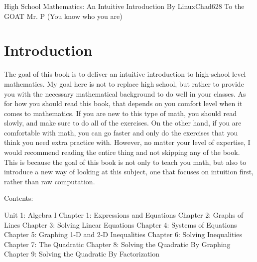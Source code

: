 \documentclass{book} %
\begin{document}
\begin{center}
\Large{High School Mathematics: An Intuitive Introduction}
\newline
\newline
\normalsize{By LinuxChad628}
\newpage
To the GOAT Mr. P (You know who you are)
\newpage
\end{center}
\chapter*{Introduction}
The goal of this book is to deliver an intuitive introduction to high-school level mathematics.
My goal here is not to replace high school, but rather to provide you with the necessary mathematical background to do well in your classes.
As for how you should read this book, that depends on you comfort level when it comes to mathematics. If you are new to this type of math, you should read slowly,
and make sure to do all of the exercises. On the other hand, if you are comfortable with math, you can go faster and only do the exercises that you think you need extra practice with.
However, no matter your level of expertise, I would recommend reading the entire thing and not skipping any of the book.
This is because the goal of this book is not only to teach you math, but also to introduce a new way of looking at this subject, one that focuses on intuition first, rather than raw computation.
\newpage
\begin{center}Contents:\end{center}
\small{Unit 1: Algebra I}
\newline
\indent \footnotesize{Chapter 1: Expressions and Equations}
\newline
\indent \footnotesize{Chapter 2: Graphs of Lines}
\newline
\indent \footnotesize{Chapter 3: Solving Linear Equations}
\newline
\indent \footnotesize{Chapter 4: Systems of Equations}
\newline
\indent \footnotesize{Chapter 5: Graphing 1-D and 2-D Inequalities}
\newline
\indent \footnotesize{Chapter 6: Solving Inequalities}
\newline
\indent \footnotesize{Chapter 7: The Quadratic}
\newline
\indent \footnotesize{Chapter 8: Solving the Quadratic By Graphing}
\newline
\indent \footnotesize{Chapter 9: Solving the Quadratic By Factorization}
\newline
\end{document}
